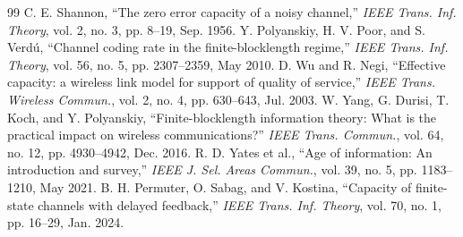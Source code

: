 \documentclass[journal]{IEEEtran}
\begin{document}
\begin{thebibliography}{99}
 C. E. Shannon, ``The zero error capacity of a noisy channel,'' \emph{IEEE Trans. Inf. Theory}, vol. 2, no. 3, pp. 8--19, Sep. 1956.
 Y. Polyanskiy, H. V. Poor, and S. Verdú, ``Channel coding rate in the finite-blocklength regime,'' \emph{IEEE Trans. Inf. Theory}, vol. 56, no. 5, pp. 2307--2359, May 2010.
 D. Wu and R. Negi, ``Effective capacity: a wireless link model for support of quality of service,'' \emph{IEEE Trans. Wireless Commun.}, vol. 2, no. 4, pp. 630--643, Jul. 2003.
 W. Yang, G. Durisi, T. Koch, and Y. Polyanskiy, ``Finite-blocklength information theory: What is the practical impact on wireless communications?'' \emph{IEEE Trans. Commun.}, vol. 64, no. 12, pp. 4930--4942, Dec. 2016.
 R. D. Yates et al., ``Age of information: An introduction and survey,'' \emph{IEEE J. Sel. Areas Commun.}, vol. 39, no. 5, pp. 1183--1210, May 2021.
 B. H. Permuter, O. Sabag, and V. Kostina, ``Capacity of finite-state channels with delayed feedback,'' \emph{IEEE Trans. Inf. Theory}, vol. 70, no. 1, pp. 16--29, Jan. 2024.
\end{thebibliography}
\end{document}
